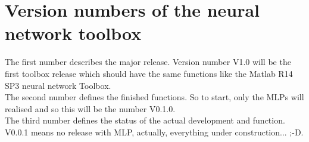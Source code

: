 \section{Version numbers of the neural network toolbox}

The first number describes the major release. Version number V1.0 will be the first toolbox release which should have the same functions like the Matlab R14 SP3 neural network Toolbox.\\

The second number defines the finished functions. So to start, only the MLPs will realised and so this will be the number V0.1.0.\\

The third number defines the status of the actual development and function. V0.0.1 means no release with MLP, actually, everything under construction... ;-D.